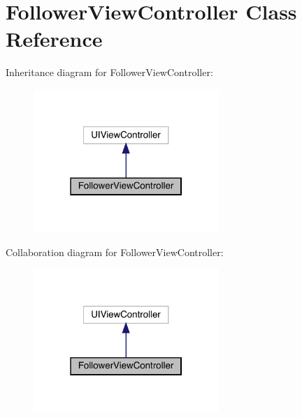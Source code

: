 \hypertarget{interface_follower_view_controller}{}\section{Follower\+View\+Controller Class Reference}
\label{interface_follower_view_controller}


Inheritance diagram for Follower\+View\+Controller\+:\nopagebreak
\begin{figure}[H]
\begin{center}
\leavevmode
\includegraphics[width=199pt]{interface_follower_view_controller__inherit__graph}
\end{center}
\end{figure}


Collaboration diagram for Follower\+View\+Controller\+:\nopagebreak
\begin{figure}[H]
\begin{center}
\leavevmode
\includegraphics[width=199pt]{interface_follower_view_controller__coll__graph}
\end{center}
\end{figure}
